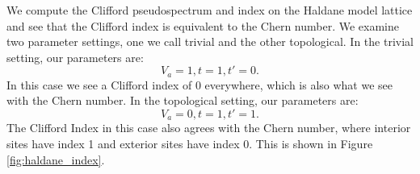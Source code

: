 \documentclass[a4paper]{article}
\begin{document}

We compute the Clifford pseudospectrum and index on the Haldane model lattice and see that the Clifford index is equivalent to the Chern number.
We examine two parameter settings, one we call trivial and the other topological.
In the trivial setting, our parameters are:
\begin{equation}
V_a = 1, t = 1, t' = 0.
\end{equation}
In this case we see a Clifford index of 0 everywhere, which is also what we see with the Chern number.
In the topological setting, our parameters are:
\begin{equation}
V_a = 0, t = 1, t' = 1.
\end{equation}
The Clifford Index in this case also agrees with the Chern number, where interior sites have index 1 and exterior sites have index 0.
This is shown in Figure \ref{fig:haldane_index}.
\end{document}
